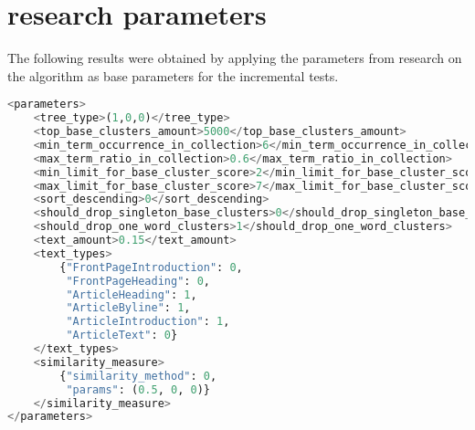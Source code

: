 

\section{\CTC research parameters}

The following results were obtained by applying the parameters from research on the \CTC algorithm as base parameters for the incremental tests.

\begin{lstlisting}[float=t, language=python, label=lst:ctcparams, caption={Parameter set used in \CTC algorithm}]
<parameters>
    <tree_type>(1,0,0)</tree_type>
    <top_base_clusters_amount>5000</top_base_clusters_amount>
    <min_term_occurrence_in_collection>6</min_term_occurrence_in_collection>
    <max_term_ratio_in_collection>0.6</max_term_ratio_in_collection>
    <min_limit_for_base_cluster_score>2</min_limit_for_base_cluster_score>
    <max_limit_for_base_cluster_score>7</max_limit_for_base_cluster_score>
    <sort_descending>0</sort_descending>
    <should_drop_singleton_base_clusters>0</should_drop_singleton_base_clusters>
    <should_drop_one_word_clusters>1</should_drop_one_word_clusters>
    <text_amount>0.15</text_amount>
    <text_types>
        {"FrontPageIntroduction": 0,
         "FrontPageHeading": 0,
         "ArticleHeading": 1,
         "ArticleByline": 1,
         "ArticleIntroduction": 1,
         "ArticleText": 0}
    </text_types>
    <similarity_measure>
        {"similarity_method": 0,
         "params": (0.5, 0, 0)}
    </similarity_measure>
</parameters>
\end{lstlisting}

